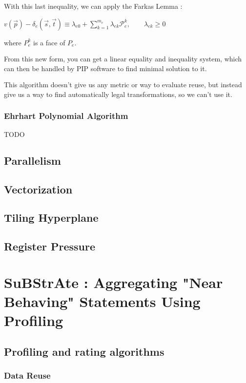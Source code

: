 \documentclass[paper=a4, fontsize=11pt]{scrartcl}
\numberwithin{equation}{section}        %
\numberwithin{figure}{section}          %
\numberwithin{table}{section}               %
\begin{document}
            With this last inequality, we can apply the Farkas Lemma :
            \begin{center}
                $v(\vec{p}) - \delta_e\left(\vec{s},\vec{t}\right) \equiv \lambda_{e0}
                + \sum\limits_{k=1}^{m_e}{\lambda_{ek}\mathcal{P}_{e}^k},\qquad \lambda_{ek} \geq 0$
            \end{center}
            where $P_e^k$ is a face of $P_e$.

            From this new form, you can get a linear equality and inequality system,
            which can then be handled by PIP software to find minimal solution to it.

            This algorithm doesn't give us any metric or way to evaluate reuse, but instead
            give us a way to find automatically legal transformations, so we can't use it.

        \subsubsection{Ehrhart Polynomial Algorithm}
            TODO

    \subsection{Parallelism}
    \subsection{Vectorization}
    \subsection{Tiling Hyperplane}
    \subsection{Register Pressure}

\section{SuBStrAte : Aggregating "Near Behaving" Statements Using Profiling}
    \subsection{Profiling and rating algorithms}
        \subsubsection{Data Reuse}
\end{document}
